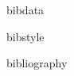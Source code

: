 %
%
\begin{docCommand}{bibdata}{}
\begin{docCommand}{bibstyle}{}
       \begin{teX}
\let\bibdata=\@gobble
\let\bibstyle=\@gobble
       \end{teX}
  \end{docCommand}
  \end{docCommand}


 \begin{docCommand}{bibliography}{}
 \end{docCommand}
%

